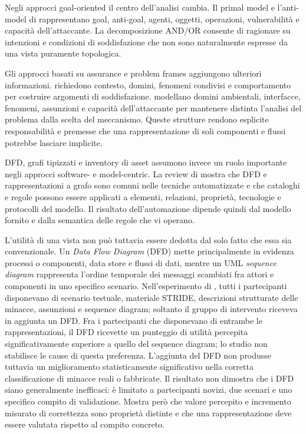 \documentclass[12pt,a4paper,oneside]{report}
\begin{document}
Negli approcci goal-oriented il centro dell'analisi cambia. Il primal model e l'anti-model di \citet{vanlamsweerde2004elaborating} rappresentano goal, anti-goal, agenti, oggetti, operazioni, vulnerabilità e capacità dell'attaccante. La decomposizione AND/OR consente di ragionare su intenzioni e condizioni di soddisfazione che non sono naturalmente espresse da una vista puramente topologica.

Gli approcci basati su assurance e problem frames aggiungono ulteriori informazioni. \citet{haley2008securityrequirements} richiedono contesto, domini, fenomeni condivisi e comportamento per costruire argomenti di soddisfazione. \citet{hatebur2006securityengineering} modellano domini ambientali, interfacce, fenomeni, assunzioni e capacità dell'attaccante per mantenere distinta l'analisi del problema dalla scelta del meccanismo. Queste strutture rendono esplicite responsabilità e premesse che una rappresentazione di soli componenti e flussi potrebbe lasciare implicite.

DFD, grafi tipizzati e inventory di asset assumono invece un ruolo importante negli approcci software- e model-centric. La review di \citet{granata2024automatedthreatmodelling} mostra che DFD e rappresentazioni a grafo sono comuni nelle tecniche automatizzate e che cataloghi e regole possono essere applicati a elementi, relazioni, proprietà, tecnologie e protocolli del modello. Il risultato dell'automazione dipende quindi dal modello fornito e dalla semantica delle regole che vi operano.

L'utilità di una vista non può tuttavia essere dedotta dal solo fatto che essa sia convenzionale. Un \emph{Data Flow Diagram} (DFD) mette principalmente in evidenza processi o componenti, data store e flussi di dati, mentre un UML \emph{sequence diagram} rappresenta l'ordine temporale dei messaggi scambiati fra attori e componenti in uno specifico scenario. Nell'esperimento di \citet{mbaka2025dfdvalidation}, tutti i partecipanti disponevano di scenario testuale, materiale STRIDE, descrizioni strutturate delle minacce, assunzioni e sequence diagram; soltanto il gruppo di intervento riceveva in aggiunta un DFD. Fra i partecipanti che disponevano di entrambe le rappresentazioni, il DFD ricevette un punteggio di utilità percepita significativamente superiore a quello del sequence diagram; lo studio non stabilisce le cause di questa preferenza. L'aggiunta del DFD non produsse tuttavia un miglioramento statisticamente significativo nella corretta classificazione di minacce reali o fabbricate. Il risultato non dimostra che i DFD siano generalmente inefficaci: è limitato a partecipanti novizi, due scenari e uno specifico compito di validazione. Mostra però che valore percepito e incremento misurato di correttezza sono proprietà distinte e che una rappresentazione deve essere valutata rispetto al compito concreto.
\end{document}
